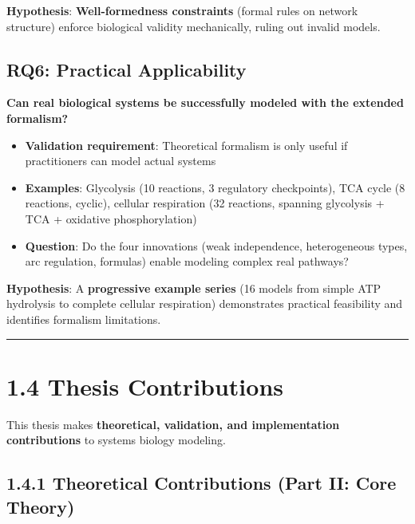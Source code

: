 \textbf{Hypothesis}: \textbf{Well-formedness constraints} (formal rules
on network structure) enforce biological validity mechanically, ruling
out invalid models.

\hypertarget{rq6-practical-applicability}{%
\subsection{RQ6: Practical
Applicability}\label{rq6-practical-applicability}}

\textbf{Can real biological systems be successfully modeled with the
extended formalism?}

\begin{itemize}
\tightlist
\item
  \textbf{Validation requirement}: Theoretical formalism is only useful
  if practitioners can model actual systems
\item
  \textbf{Examples}: Glycolysis (10 reactions, 3 regulatory
  checkpoints), TCA cycle (8 reactions, cyclic), cellular respiration
  (32 reactions, spanning glycolysis + TCA + oxidative phosphorylation)
\item
  \textbf{Question}: Do the four innovations (weak independence,
  heterogeneous types, arc regulation, formulas) enable modeling complex
  real pathways?
\end{itemize}

\textbf{Hypothesis}: A \textbf{progressive example series} (16 models
from simple ATP hydrolysis to complete cellular respiration)
demonstrates practical feasibility and identifies formalism limitations.

\begin{center}\rule{0.5\linewidth}{0.5pt}\end{center}

\hypertarget{thesis-contributions}{%
\section{1.4 Thesis Contributions}\label{thesis-contributions}}

This thesis makes \textbf{theoretical, validation, and implementation
contributions} to systems biology modeling.

\hypertarget{theoretical-contributions-part-ii-core-theory}{%
\subsection{1.4.1 Theoretical Contributions (Part II: Core
Theory)}\label{theoretical-contributions-part-ii-core-theory}}

